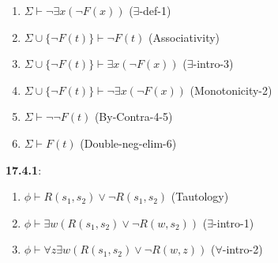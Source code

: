 \documentclass{article}
\begin{document}
\begin{flushleft}
\begin{enumerate}
    \item $\Sigma \vdash \neg \exists x (\neg F(x))$ \hspace{2mm} ($\exists$-def-1)
    \item $\Sigma \cup \{{\neg F(t)}\} \vdash \neg F(t)$ \hspace{2mm} (Associativity)
    \item $\Sigma \cup \{{\neg F(t)}\} \vdash \exists x (\neg F(x))$ \hspace{2mm} ($\exists$-intro-3)
    \item $\Sigma \cup \{{\neg F(t)}\} \vdash \neg \exists x(\neg F(x))$ \hspace{2mm} (Monotonicity-2)
    \item $\Sigma \vdash \neg \neg F(t)$  \hspace{2mm} (By-Contra-4-5)
    \item  $\Sigma \vdash F(t)$  \hspace{2mm} (Double-neg-elim-6)
\end{enumerate}
\textbf{17.4.1}: \\
\begin{enumerate}
    \item $ \phi \vdash R(s_1,s_2) \vee \neg R(s_1,s_2)$ \hspace{2mm} (Tautology)
    \item $\phi \vdash \exists w (R(s_1,s_2)\vee \neg R(w,s_2))$ \hspace{2mm} ($\exists$-intro-1)
    \item $\phi \vdash \forall z \exists w (R(s_1,s_2)\vee \neg R(w,z))$ \hspace{2mm} ($\forall$-intro-2)
\end{enumerate}
\end{flushleft}
\end{document}
